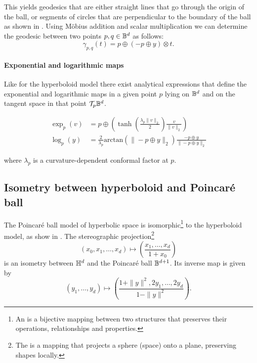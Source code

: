 This yields geodesics that are either straight lines that go through the origin of the ball, or segments of circles that are perpendicular to the boundary of the ball as shown in . Using Möbius addition and scalar multiplication we can determine the geodesic between two points $p,q\in\mathbb{B}^d$ as follows:
\begin{equation*}
    \gamma_{p,q}(t) = p\oplus (-p \oplus y) \otimes t.
\end{equation*}

\paragraph{Exponential and logarithmic maps}\label{sec:expLogMaps_poincareBall}
Like for the hyperboloid model there exist analytical expressions that define the exponential and logarithmic maps in a given point $p$ lying on $\mathbb{B}^d$ and on the tangent space in that point $\mathcal{T}_p\mathbb{B}^d$. 

\begin{align}
    \exp_p(v) &= p \oplus \left(\tanh\left(\frac{\lambda_p\|v\|_2}{2}\right)\frac{v}{\|v\|_2}\right) \label{eq:exp_poincareBall} \\
    \log_p(y) &= \frac{2}{\lambda_p}\text{arctan}(\|-p \oplus y\|_2)\frac{-p \oplus y}{\|-p \oplus y\|_2} \label{eq:log_poincareBall}
\end{align}

where $\lambda_p$ is a curvature-dependent conformal factor at $p$.



\subsection{Isometry between hyperboloid and Poincaré ball}\label{sec:isometry}
The Poincaré ball model of hyperbolic space is isomorphic\footnote{An  is a bijective mapping between two structures that preserves their operations, relationships and properties.} to the hyperboloid model, as show in . The stereographic projection\footnote{The  is a mapping that projects a sphere (space) onto a plane, preserving shapes locally.}
\begin{equation}\label{eq:stereographicProjection}
    (x_0, x_1, \ldots, x_d) \mapsto \left(\frac{x_1, \ldots, {x_d}}{1+x_0}\right)
\end{equation}
is an isometry between $\mathbb{H}^{d}$ and the Poincaré ball $\mathbb{B}^{d+1}$. Its inverse map is given by
\begin{equation}\label{eq:inverseStereographicProjection}
    (y_1, \ldots, y_d) \mapsto \left(\frac{1 + \|y\|^2, 2y_1, \ldots, 2y_d}{1 - \|y\|^2}\right).
\end{equation}

